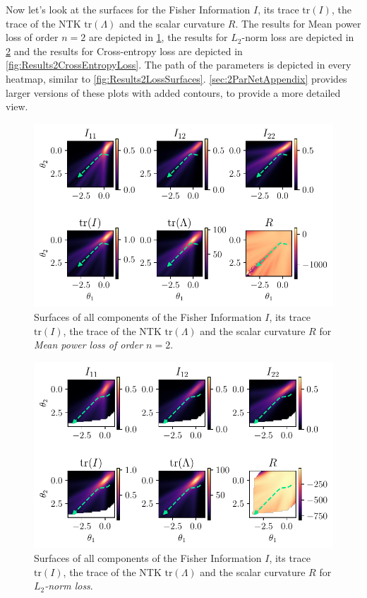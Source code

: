 Now let's look at the surfaces for the Fisher Information $I$, its trace $\mathrm{tr}(I)$, the trace of the NTK $\mathrm{tr}(\Lambda)$ and the scalar curvature $R$. The results for Mean power loss of order $n=2$ are depicted in \cref{fig:Results2MeanPowerLoss}, the results for $L_2$-norm loss are depicted in \cref{fig:Results2LPNormLoss} and the results for Cross-entropy loss are depicted in \cref{fig:Results2CrossEntropyLoss}. The path of the parameters is depicted in every heatmap, similar to \cref{fig:Results2LossSurfaces}. \cref{sec:2ParNetAppendix} provides larger versions of these plots with added contours, to provide a more detailed view.\\
\begin{figure}
	\centering
	\includegraphics{Experiment2/plots/MeanPowerLoss2_tracecomparison.pdf}
	\caption{Surfaces of all components of the Fisher Information $I$, its trace $\mathrm{tr}(I)$, the trace of the NTK $\mathrm{tr}(\Lambda)$ and the scalar curvature $R$ for \emph{Mean power loss of order $n=2$}.}
	\label{fig:Results2MeanPowerLoss}
\end{figure}
\begin{figure}
	\centering
	\includegraphics{Experiment2/plots/LPNormLoss2_tracecomparison.pdf}
	\caption{Surfaces of all components of the Fisher Information $I$, its trace $\mathrm{tr}(I)$, the trace of the NTK $\mathrm{tr}(\Lambda)$ and the scalar curvature $R$ for \emph{$L_2$-norm loss}.}
	\label{fig:Results2LPNormLoss}
\end{figure}
